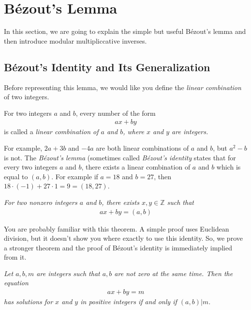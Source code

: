 \documentclass{subfile}
\begin{document}
	\section{B\'{e}zout's Lemma}
	
	In this section, we are going to explain the simple but useful B\'{e}zout's lemma and then introduce modular multipliccative inverses.
	
	\subsection{B\'{e}zout's Identity and Its Generalization}
	Before representing this lemma, we would like you define the \textit{linear combination} of two integers.
	
	\begin{definition}\label{def:linearcombination}
		For two integers $a$ and $b$, every number of the form
		\begin{align*} ax+by\end{align*}
		is called a \itshape{linear combination} of $a$ and $b$, where $x$ and $y$ are integers.
	\end{definition}
	
	For example, $2a+3b$ and $-4a$ are both linear combinations of $a$ and $b$, but $a^2-b$ is not. The \textit{B\'{e}zout's lemma} (sometimes called \textit{B\'{e}zout's identity} states that for every two integers $a$ and $b$, there exists a linear combination of $a$ and $b$ which is equal to $(a,b)$. For example if $a=18$ and $b=27$, then $18 \cdot (-1) + 27 \cdot 1 = 9 =(18,27)$.
	
	\begin{theorem}  \slshape
		For two nonzero integers $a$ and $b$, there exists $x, y \in \mathbb Z$ such that
		\begin{align*}
		ax+by = (a,b)
		\end{align*}
	\end{theorem}
	
	You are probably familiar with this theorem. A simple proof uses Euclidean division, but it doesn't show you where exactly to use this identity. So, we prove a stronger theorem and the proof of B\'{e}zout's identity is immediately implied from it.
	
	\begin{theorem}\slshape \label{thm:equationgcd}
		Let $a,b,m$ are integers such that $a, b$ are not zero at the same time. Then the equation
		\begin{align*} ax + by = m\end{align*}
		has solutions for $x$ and $y$ in positive integers if and only if $(a,b) | m$.
	\end{theorem}
	
\end{document}
